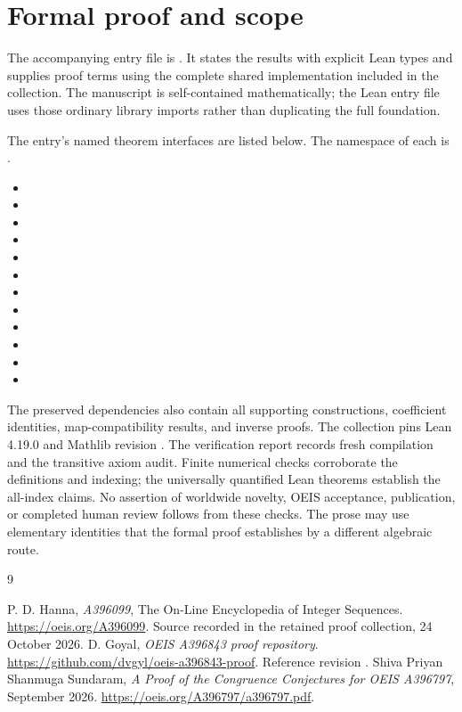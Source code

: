\documentclass[11pt,a4paper]{article}
\theoremstyle{remark}\newtheorem{remark}[theorem]{Remark}
\begin{document}
\section{Formal proof and scope}
The accompanying entry file is .
It states the results with explicit Lean types and supplies proof terms
using the complete shared implementation included in the collection.
The manuscript is self-contained mathematically; the Lean entry file uses
those ordinary library imports rather than duplicating the full foundation.

The entry's named theorem interfaces are listed below. The namespace of
each is .
\begin{itemize}[leftmargin=1.5em,itemsep=1pt]
\item {}
\item {}
\item {}
\item {}
\item {}
\item {}
\item {}
\item {}
\item {}
\item {}
\item {}
\item {}
\end{itemize}
The preserved dependencies also contain all supporting constructions,
coefficient identities, map-compatibility results, and inverse proofs.
The collection pins Lean 4.19.0 and Mathlib revision
.
The verification report records fresh compilation and the transitive axiom
audit. Finite numerical checks corroborate the definitions and indexing;
the universally quantified Lean theorems establish the all-index claims.
No assertion of worldwide novelty, OEIS acceptance, publication, or completed
human review follows from these checks. The prose may use elementary
identities that the formal proof establishes by a different algebraic route.

\begin{thebibliography}{9}\raggedright
{} P. D. Hanna, \emph{A396099}, The On-Line Encyclopedia of Integer
Sequences. \url{https://oeis.org/A396099}. Source recorded in the retained
proof collection, 24 October 2026.
 D. Goyal, \emph{OEIS A396843 proof repository}.
\url{https://github.com/dvgyl/oeis-a396843-proof}.
Reference revision .
 Shiva Priyan Shanmuga Sundaram,
\emph{A Proof of the Congruence Conjectures for OEIS A396797}, September 2026.
\url{https://oeis.org/A396797/a396797.pdf}.
\end{thebibliography}
\end{document}
